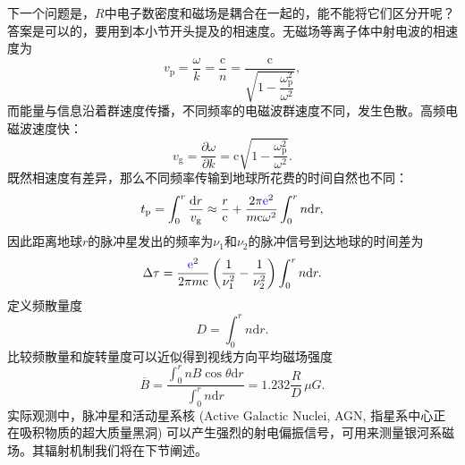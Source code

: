\documentclass[../天体物理基础.tex]{subfiles}
\begin{document}
\newpage
下一个问题是，$R$中电子数密度和磁场是耦合在一起的，能不能将它们区分开呢？答案是可以的，要用到本小节开头提及的相速度。无磁场等离子体中射电波的相速度为
\begin{equation}
v_{\text{p}}=\frac{\omega}{k}=\frac{\mathrm{c}}{n}=\frac{\mathrm{c}}{\sqrt{1-\dfrac{\omega_{\text{p}}^{2}}{\omega^{2}}}},
\end{equation}
而能量与信息沿着群速度传播，不同频率的电磁波群速度不同，发生色散。高频电磁波速度快：
\begin{equation}
v_{\text{g}}=\frac{\partial{}\omega}{\partial{}k}=\mathrm{c}\sqrt{1-\frac{\omega_{\text{p}}^{2}}{\omega^{2}}}.
\end{equation}
既然相速度有差异，那么不同频率传输到地球所花费的时间自然也不同：
\begin{equation}
t_{\text{p}}=\int_{0}^{r}\frac{\mathrm{d}r}{v_{\text{g}}}\approx\frac{r}{\mathrm{c}}+\frac{2\pi{\color{blue}{\ce{e}}}^{2}}{m\mathrm{c}\omega^{2}}\int_{0}^{r}n\mathrm{d}r,
\end{equation}
因此距离地球$r$的脉冲星发出的频率为$\nu_{1}$和$\nu_{2}$的脉冲信号到达地球的时间差为
\begin{equation}
\Delta{}\tau=\frac{{\color{blue}{\ce{e}}}^{2}}{2\pi m\mathrm{c}}\left(\frac{1}{\nu_{1}^{2}}-\frac{1}{\nu_{2}^{2}}\right)\int_{0}^{r}n\mathrm{d}r.
\end{equation}
定义频散量度
\begin{equation}
D=\int_{0}^{r}n\mathrm{d}r.
\end{equation}
比较频散量和旋转量度可以近似得到视线方向平均磁场强度
\begin{equation}
\overline{B}=\frac{\int_{0}^{r}nB\cos\theta\mathrm{d}r}{\int_{0}^{r}n\mathrm{d}r}=1.232\frac{R}{D}\,\unit{\mu G}.
\end{equation}
实际观测中，脉冲星和活动星系核 (Active Galactic Nuclei, AGN, 指星系中心正在吸积物质的超大质量黑洞) 可以产生强烈的射电偏振信号，可用来测量银河系磁场。其辐射机制我们将在下节阐述。
\end{document}
